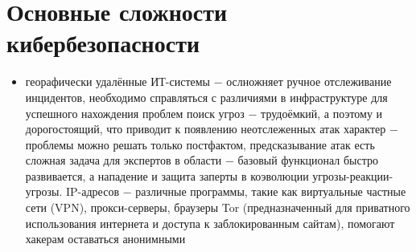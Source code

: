 \documentclass{article}
\begin{document}
\section*{Основные сложности кибербезопасности}
\begin{itemize}
    \item георафически удалённые ИТ-системы − ослножняет ручное отслеживание инцидентов, необходимо справляться с различиями в инфраструктуре для успешного нахождения проблем
     поиск угроз − трудоёмкий, а поэтому и дорогостоящий, что приводит к появлению неотслеженных атак
     характер − проблемы можно решать только постфактом, предсказывание атак есть сложная задача для экспертов в области
     − базовый функционал быстро развивается, а нападение и защита заперты в коэволюции угрозы-реакции-угрозы.
     IP-адресов − различные программы, такие как виртуальные частные сети (VPN), прокси-серверы, браузеры Tor (предназначенный для приватного использования интернета и доступа к заблокированным сайтам), помогают хакерам оставаться анонимными

\end{itemize}
\end{document}
